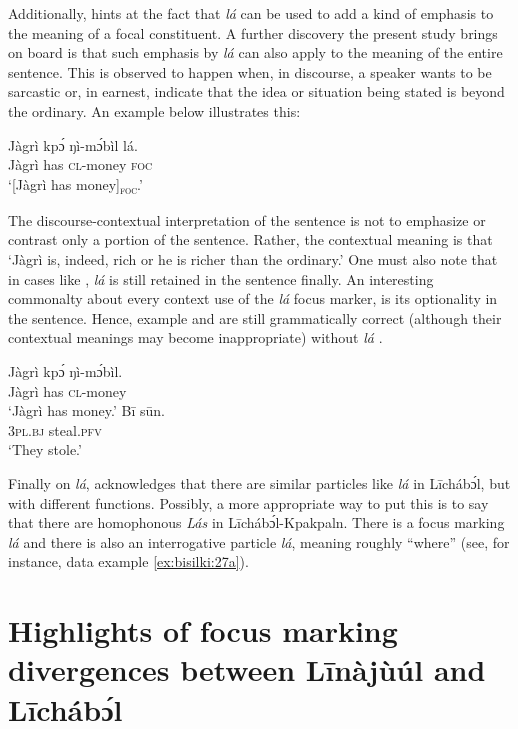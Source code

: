 \documentclass[output=paper,colorlinks,citecolor=brown]{langscibook}
\begin{document}
Additionally, \citet{Schwarz2009} hints at the fact that \textit{lá} can be used to add a kind of emphasis to the meaning of a focal constituent. A further discovery the present study brings on board is that such emphasis by \textit{lá} can also apply to the meaning of the entire sentence. This is observed to happen when, in discourse, a speaker wants to be sarcastic or, in earnest, indicate that the idea or situation being stated is beyond the ordinary. An example  below illustrates this:

\ea%
    \label{ex:bisilki:28}
    \gll    Jàgrì	kpɔ́	ŋì-mɔ́bìl	lá.\\
            Jàgrì	has	\textsc{cl-}money	\textsc{foc}\\
    \glt    ‘[Jàgrì has money]\textsubscript{\textsc{foc}}.’
\z

The discourse-contextual interpretation of the sentence  is not to emphasize or contrast only a portion of the sentence. Rather, the contextual meaning is that `Jàgrì is, indeed, rich or he is richer than the ordinary.' One must also note that in cases like , \textit{lá} is still retained in the sentence finally. An interesting commonalty about every context use of the \textit{lá} focus marker, is its optionality in the sentence. Hence, example  and  are still grammatically correct (although their contextual meanings may become inappropriate) without \textit{lá} .

\ea%
    \label{ex:bisilki:29}
    \ea\label{ex:bisilki:29a}
    \gll    Jàgrì	kpɔ́	ŋì-mɔ́bìl.\\
            Jàgrì	has	\textsc{cl-}money\\
    \glt    ‘Jàgrì has money.’
    \ex\label{ex:bisilki:29b}
    \gll    Bī		sūn.\\
            \textsc{3pl.bj}		steal\textsc{.pfv}\\
    \glt    ‘They stole.’
    \z
\z

Finally on \textit{lá}, \citet{Schwarz2009} acknowledges that there are similar particles like \textit{lá} in Līcháb\'{ɔ}l, but with different functions. Possibly, a more appropriate way to put this is to say that there are homophonous \textit{Lás} in Līcháb\'{ɔ}l-Kpakpaln. There is a focus marking \textit{lá} and there is also an interrogative particle \textit{lá}, meaning roughly “where” (see, for instance, data example \ref{ex:bisilki:27a}).

\section{Highlights of focus marking divergences between Līnàjùúl and Līcháb\'{ɔ}l}\label{sec:bisilki:8}
\end{document}
